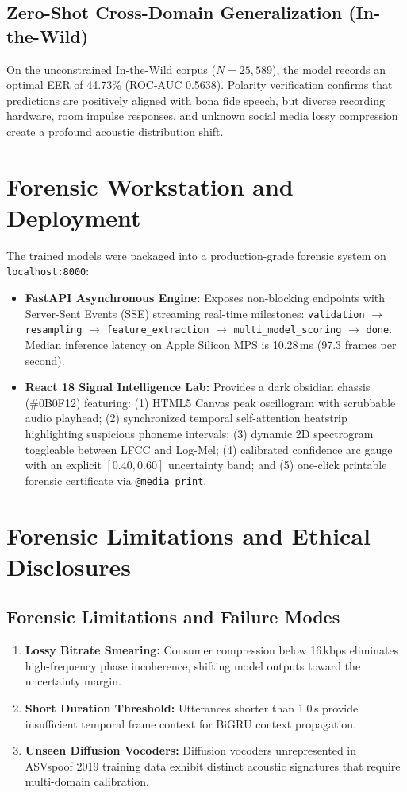 \documentclass[conference]{IEEEtran}
\begin{document}
\subsection{Zero-Shot Cross-Domain Generalization (In-the-Wild)}
On the unconstrained In-the-Wild corpus ($N = 25{,}589$), the model records an optimal EER of 44.73\% (ROC-AUC 0.5638). Polarity verification confirms that predictions are positively aligned with bona fide speech, but diverse recording hardware, room impulse responses, and unknown social media lossy compression create a profound acoustic distribution shift.

\section{Forensic Workstation and Deployment}

The trained models were packaged into a production-grade forensic system on \texttt{localhost:8000}:
\begin{itemize}
    \item \textbf{FastAPI Asynchronous Engine:} Exposes non-blocking endpoints with Server-Sent Events (SSE) streaming real-time milestones: \texttt{validation} $\rightarrow$ \texttt{resampling} $\rightarrow$ \texttt{feature\_extraction} $\rightarrow$ \texttt{multi\_model\_scoring} $\rightarrow$ \texttt{done}. Median inference latency on Apple Silicon MPS is 10.28\,ms (97.3 frames per second).
    \item \textbf{React 18 Signal Intelligence Lab:} Provides a dark obsidian chassis (\#0B0F12) featuring: (1) HTML5 Canvas peak oscillogram with scrubbable audio playhead; (2) synchronized temporal self-attention heatstrip highlighting suspicious phoneme intervals; (3) dynamic 2D spectrogram toggleable between LFCC and Log-Mel; (4) calibrated confidence arc gauge with an explicit $[0.40, 0.60]$ uncertainty band; and (5) one-click printable forensic certificate via \texttt{@media print}.
\end{itemize}

\section{Forensic Limitations and Ethical Disclosures}

\subsection{Forensic Limitations and Failure Modes}
\begin{enumerate}
    \item \textbf{Lossy Bitrate Smearing:} Consumer compression below 16\,kbps eliminates high-frequency phase incoherence, shifting model outputs toward the uncertainty margin.
    \item \textbf{Short Duration Threshold:} Utterances shorter than 1.0\,s provide insufficient temporal frame context for BiGRU context propagation.
    \item \textbf{Unseen Diffusion Vocoders:} Diffusion vocoders unrepresented in ASVspoof 2019 training data exhibit distinct acoustic signatures that require multi-domain calibration.
\end{enumerate}
\end{document}

